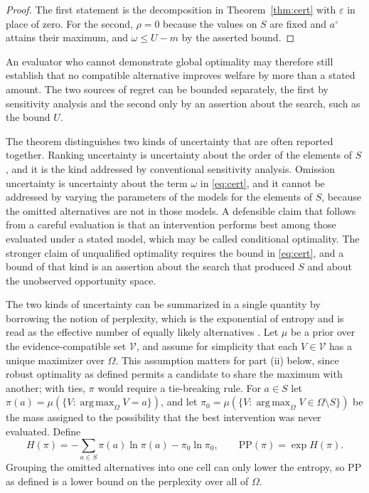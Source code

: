 \documentclass[11pt]{article}
\theoremstyle{definition}
\theoremstyle{remark}
\DeclareMathOperator*{\argmax}{arg\,max}
\begin{document}
\begin{proof}
The first statement is the decomposition in Theorem~\ref{thm:cert} with $\varepsilon$ in place of zero. For the second, $\rho=0$ because the values on $S$ are fixed and $a^{\circ}$ attains their maximum, and $\omega\le U-m$ by the asserted bound.
\end{proof}

An evaluator who cannot demonstrate global optimality may therefore still establish that no compatible alternative improves welfare by more than a stated amount. The two sources of regret can be bounded separately, the first by sensitivity analysis and the second only by an assertion about the search, such as the bound $U$.

The theorem distinguishes two kinds of uncertainty that are often reported together. Ranking uncertainty is uncertainty about the order of the elements of $S$, and it is the kind addressed by conventional sensitivity analysis. Omission uncertainty is uncertainty about the term $\omega$ in \eqref{eq:cert}, and it cannot be addressed by varying the parameters of the models for the elements of $S$, because the omitted alternatives are not in those models. A defensible claim that follows from a careful evaluation is that an intervention performs best among those evaluated under a stated model, which may be called conditional optimality. The stronger claim of unqualified optimality requires the bound in \eqref{eq:cert}, and a bound of that kind is an assertion about the search that produced $S$ and about the unobserved opportunity space.

The two kinds of uncertainty can be summarized in a single quantity by borrowing the notion of perplexity, which is the exponential of entropy and is read as the effective number of equally likely alternatives \citep{jelinek1977}. Let $\mu$ be a prior over the evidence-compatible set $\mathcal V$, and assume for simplicity that each $V\in\mathcal V$ has a unique maximizer over $\Omega$. This assumption matters for part (ii) below, since robust optimality as defined permits a candidate to share the maximum with another; with ties, $\pi$ would require a tie-breaking rule. For $a\in S$ let $\pi(a)=\mu(\{V:\argmax_{\Omega}V=a\})$, and let $\pi_0=\mu(\{V:\argmax_{\Omega}V\in\Omega\setminus S\})$ be the mass assigned to the possibility that the best intervention was never evaluated. Define
\begin{equation}
H(\pi)=-\sum_{a\in S}\pi(a)\ln\pi(a)-\pi_0\ln\pi_0,\qquad \mathrm{PP}(\pi)=\exp H(\pi).
\label{eq:pp}
\end{equation}
Grouping the omitted alternatives into one cell can only lower the entropy, so $\mathrm{PP}$ as defined is a lower bound on the perplexity over all of $\Omega$.
\end{document}
